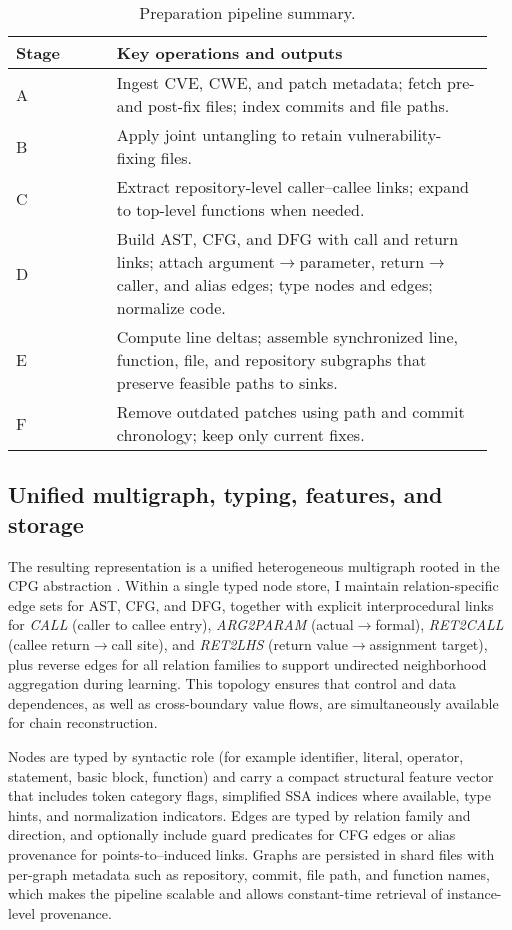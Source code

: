 \documentclass{buthesis}
\begin{document}
\begin{table}[H]
\centering
\caption{Preparation pipeline summary.}
\label{tab:pipeline}
\begin{tabular}{p{0.20\linewidth} p{0.75\linewidth}}
\toprule
\textbf{Stage} & \textbf{Key operations and outputs} \\
\midrule
A & Ingest CVE, CWE, and patch metadata; fetch pre- and post-fix files; index commits and file paths. \\
B & Apply joint untangling to retain vulnerability-fixing files. \\
C & Extract repository-level caller–callee links; expand to top-level functions when needed. \\
D & Build AST, CFG, and DFG with call and return links; attach argument$\rightarrow$parameter, return$\rightarrow$caller, and alias edges; type nodes and edges; normalize code. \\
E & Compute line deltas; assemble synchronized line, function, file, and repository subgraphs that preserve feasible paths to sinks. \\
F & Remove outdated patches using path and commit chronology; keep only current fixes. \\
\bottomrule
\end{tabular}
\end{table}


\subsection{Unified multigraph, typing, features, and storage}
\label{subsec:unified-mg}

The resulting representation is a unified heterogeneous multigraph rooted in the CPG abstraction \cite{yamaguchi2014cpg}. Within a single typed node store, I maintain relation-specific edge sets for AST, CFG, and DFG, together with explicit interprocedural links for \emph{CALL} (caller to callee entry), \emph{ARG2PARAM} (actual$\rightarrow$formal), \emph{RET2CALL} (callee return$\rightarrow$call site), and \emph{RET2LHS} (return value$\rightarrow$assignment target), plus reverse edges for all relation families to support undirected neighborhood aggregation during learning. This topology ensures that control and data dependences, as well as cross-boundary value flows, are simultaneously available for chain reconstruction.

Nodes are typed by syntactic role (for example identifier, literal, operator, statement, basic block, function) and carry a compact structural feature vector that includes token category flags, simplified SSA indices where available, type hints, and normalization indicators. Edges are typed by relation family and direction, and optionally include guard predicates for CFG edges or alias provenance for points-to–induced links. Graphs are persisted in shard files with per-graph metadata such as repository, commit, file path, and function names, which makes the pipeline scalable and allows constant-time retrieval of instance-level provenance.
\end{document}
